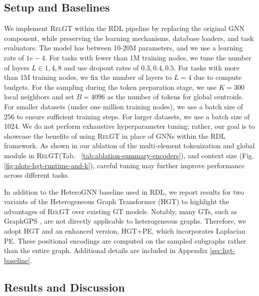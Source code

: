 \documentclass{article} %
\newcommand{\RelGT}{\textsc{RelGT}\xspace}
\begin{document}
\subsection{Setup and Baselines}
\label{sec:experiments-setup}
We implement \RelGT within the RDL pipeline \citep{robinson2025relbench} by replacing the original GNN component, while preserving the learning mechanisms, database loaders, and task evaluators.
The model has between 10-20M parameters, and we use a learning rate of $1e-4$. For tasks with fewer than 1M training nodes, we tune the number of layers $L \in {1, 4, 8}$ and use dropout rates of ${0.3, 0.4, 0.5}$. For tasks with more than 1M training nodes, we fix the number of layers to $L = 4$ due to compute budgets. 
For the sampling during the token preparation stage, we use $K = 300$ local neighbors and set $B = 4096$ as the number of tokens for global centroids. For smaller datasets (under one million training nodes), we use a batch size of 256 to ensure sufficient training steps. For larger datasets, we use a batch size of 1024.
We do not perform exhaustive hyperparameter tuning; rather, our goal is to showcase the benefits of using \RelGT in place of GNNs within the RDL framework. As shown in our ablation of the multi-element tokenization and global module in \RelGT (Tab. ~\ref{tab:ablation-summary-encoders}), and context size (Fig. \ref{fig:plots-hgt-runtime-and-k}), careful tuning may further improve performance across different tasks.

In addition to the HeteroGNN baseline used in RDL, we report results for two variants of the Heterogeneous Graph Transformer (HGT) \citep{hu2020heterogeneous} to highlight the advantages of \RelGT over existing GT models. Notably, many GTs, such as GraphGPS \citep{rampavsek2022recipe}, are not directly applicable to heterogeneous graphs. Therefore, we adopt HGT and an enhanced version, HGT+PE, which incorporates Laplacian PE. These positional encodings are computed on the sampled subgraphs rather than the entire graph. Additional 
details are included in Appendix \ref{sec:hgt-baseline}.





\subsection{Results and Discussion}
\label{sec:experiments-discussion}
\end{document}
